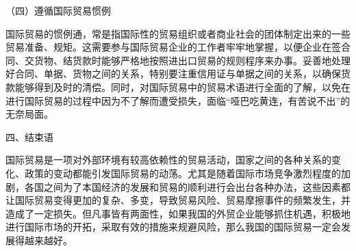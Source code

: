 （四）遵循国际贸易惯例

国际贸易的惯例通，常是指国际性的贸易组织或者商业社会的团体制定出来的一些贸易准备、规矩。这需要参与国际贸易企业的工作者牢牢地掌握，以便企业在签合同、交货物、结货款时能够严格地按照进出口贸易的规则程序来办事。妥善地处理好合同、单据、货物之间的关系，特别要注重信用证与单据之间的关系，以确保货款能够得到及时的清偿。同时，对国际贸易中的贸易术语进行全面的了解，以免在进行国际贸易的过程中因为不了解而遭受损失，面临“哑巴吃黄连，有苦说不出”的无奈局面。

四、结束语

国际贸易是一项对外部环境有较高依赖性的贸易活动，国家之间的各种关系的变化、政策的变动都能引发国际贸易的动荡。尤其是随着国际市场竞争激烈程度的加剧，各国之间为了本国经济的发展和贸易的顺利进行会出台各种办法，这些因素都让国际贸易变得更加的复杂、多变，导致贸易风险、贸易摩擦事件的频繁发生，并造成了一定损失。但凡事皆有两面性，如果我国的外贸企业能够抓住机遇，积极地进行国际市场的开拓，采取有效的措施来规避风险，那么我国的国际贸易一定会发展得越来越好。